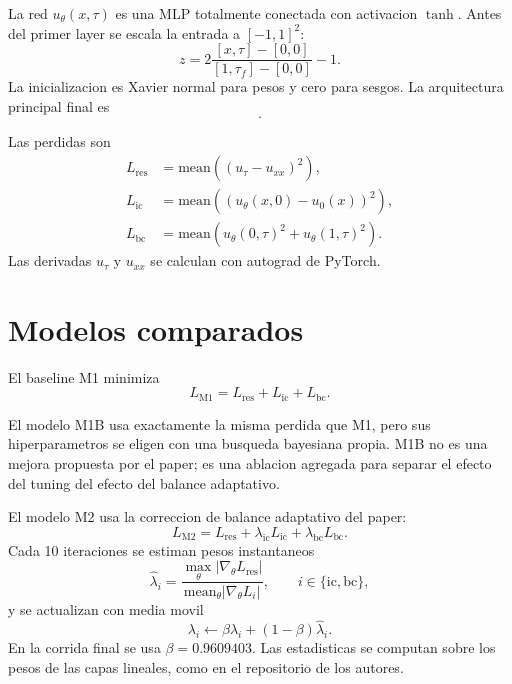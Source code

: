 \documentclass[11pt,a4paper]{article}
\begin{document}
La red $u_\theta(x,\tau)$ es una MLP totalmente conectada con activacion
$\tanh$. Antes del primer layer se escala la entrada a $[-1,1]^2$:
\begin{equation}
  z = 2\frac{[x,\tau]-[0,0]}{[1,\tau_f]-[0,0]}-1.
\end{equation}
La inicializacion es Xavier normal para pesos y cero para sesgos. La arquitectura
principal final es
\begin{equation}
  [2,80,80,80,1].
\end{equation}

Las perdidas son
\begin{align}
  L_{\mathrm{res}} &= \mathrm{mean}\left((u_\tau-u_{xx})^2\right),\\
  L_{\mathrm{ic}}  &= \mathrm{mean}\left((u_\theta(x,0)-u_0(x))^2\right),\\
  L_{\mathrm{bc}}  &= \mathrm{mean}\left(u_\theta(0,\tau)^2+
                     u_\theta(1,\tau)^2\right).
\end{align}
Las derivadas $u_\tau$ y $u_{xx}$ se calculan con autograd de PyTorch.

\section{Modelos comparados}

El baseline M1 minimiza
\begin{equation}
  L_{\mathrm{M1}}=L_{\mathrm{res}}+L_{\mathrm{ic}}+L_{\mathrm{bc}}.
\end{equation}

El modelo M1B usa exactamente la misma perdida que M1, pero sus hiperparametros
se eligen con una busqueda bayesiana propia. M1B no es una mejora propuesta por
el paper; es una ablacion agregada para separar el efecto del tuning del efecto
del balance adaptativo.

El modelo M2 usa la correccion de balance adaptativo del paper:
\begin{equation}
  L_{\mathrm{M2}}=
  L_{\mathrm{res}}+\lambda_{\mathrm{ic}}L_{\mathrm{ic}}
  +\lambda_{\mathrm{bc}}L_{\mathrm{bc}}.
\end{equation}
Cada 10 iteraciones se estiman pesos instantaneos
\begin{equation}
  \widehat{\lambda}_i =
  \frac{\max_\theta |\nabla_\theta L_{\mathrm{res}}|}
       {\mathrm{mean}_\theta |\nabla_\theta L_i|},
  \qquad i\in\{\mathrm{ic},\mathrm{bc}\},
\end{equation}
y se actualizan con media movil
\begin{equation}
  \lambda_i \leftarrow
  \beta\lambda_i+(1-\beta)\widehat{\lambda}_i.
\end{equation}
En la corrida final se usa $\beta=0.9609403$. Las estadisticas se computan
sobre los pesos de las capas lineales, como en el repositorio de los autores.
\end{document}

